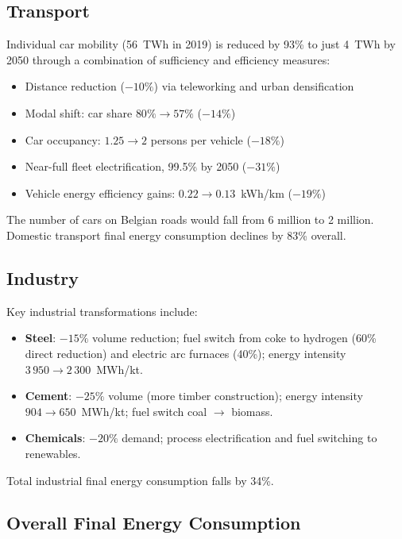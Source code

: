 \subsection{Transport}

Individual car mobility (56~TWh in 2019) is reduced by 93\% to just 4~TWh by 2050
through a combination of sufficiency and efficiency measures:

\begin{itemize}[noitemsep]
    \item Distance reduction ($-10\%$) via teleworking and urban densification
    \item Modal shift: car share $80\% \to 57\%$ ($-14\%$)
    \item Car occupancy: $1.25 \to 2$ persons per vehicle ($-18\%$)
    \item Near-full fleet electrification, 99.5\% by 2050 ($-31\%$)
    \item Vehicle energy efficiency gains: $0.22 \to 0.13$~kWh/km ($-19\%$)
\end{itemize}

The number of cars on Belgian roads would fall from 6 million to 2 million.
Domestic transport final energy consumption declines by 83\% overall.

\subsection{Industry}

Key industrial transformations include:
\begin{itemize}[noitemsep]
    \item \textbf{Steel}: $-15\%$ volume reduction; fuel switch from coke to
          hydrogen (60\% direct reduction) and electric arc furnaces (40\%);
          energy intensity $3\,950 \to 2\,300$~MWh/kt.
    \item \textbf{Cement}: $-25\%$ volume (more timber construction); energy
          intensity $904 \to 650$~MWh/kt; fuel switch coal $\to$ biomass.
    \item \textbf{Chemicals}: $-20\%$ demand; process electrification and
          fuel switching to renewables.
\end{itemize}

Total industrial final energy consumption falls by 34\%.

\subsection{Overall Final Energy Consumption}


